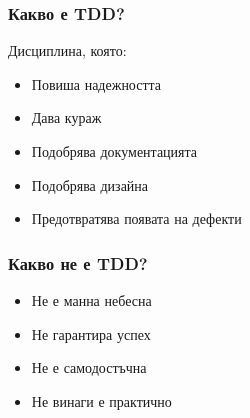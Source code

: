 \begin{frame}
  \frametitle{Какво е TDD?}
  Дисциплина\pause, която:
  \begin{itemize}
    \item Повиша надежността \pause
    \item Дава кураж\pause
    \item Подобрява документацията\pause
    \item Подобрява дизайна\pause
    \item Предотвратява появата на дефекти
  \end{itemize}
\end{frame}


\begin{frame}
  \frametitle{Какво не е TDD?}
  \begin{itemize}
    \item Не е манна небесна\pause
    \item Не гарантира успех\pause
    \item Не е самодостъчна\pause
    \item Не винаги е практично
  \end{itemize}
\end{frame}

